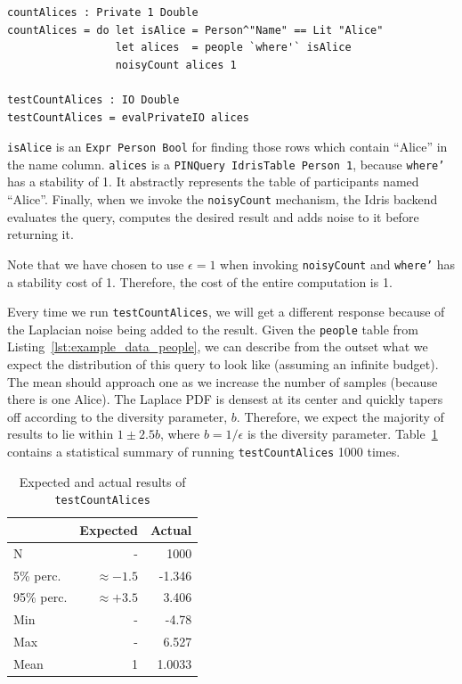 \documentclass[12pt]{article}
\begin{document}
\begin{lstlisting}
countAlices : Private 1 Double
countAlices = do let isAlice = Person^"Name" == Lit "Alice"
                 let alices  = people `where'` isAlice
                 noisyCount alices 1

testCountAlices : IO Double
testCountAlices = evalPrivateIO alices
\end{lstlisting}

\texttt{isAlice} is an \texttt{Expr Person Bool} for finding those rows which contain ``Alice'' in the name column.
\texttt{alices} is a \texttt{PINQuery IdrisTable Person 1}, because \texttt{where'} has a stability of 1.
It abstractly represents the table of participants named ``Alice''.
Finally, when we invoke the \texttt{noisyCount} mechanism, the Idris backend evaluates the query, computes the desired result and adds noise to it before returning it.

Note that we have chosen to use $\epsilon = 1$ when invoking \texttt{noisyCount} and \texttt{where'} has a stability cost of 1.
Therefore, the cost of the entire computation is 1.

Every time we run \texttt{testCountAlices}, we will get a different response because of the Laplacian noise being added to the result.
Given the \texttt{people} table from Listing~\ref{lst:example_data_people}, we can describe from the outset what we expect the distribution of this query to look like (assuming an infinite budget).
The mean should approach one as we increase the number of samples (because there is one Alice).
The Laplace PDF is densest at its center and quickly tapers off according to the diversity parameter, $b$.
Therefore, we expect the majority of results to lie within $1 \pm 2.5b$, where $b=1/\epsilon$ is the diversity parameter.
Table~\ref{tab:testCountAlices_results} contains a statistical summary of running \texttt{testCountAlices} 1000 times.

\begin{table}[h!]
  \caption{Expected and actual results of \texttt{testCountAlices}}
  \label{tab:testCountAlices_results}
  \centering

  \begin{tabular}{|l|rr|}
  \hline

  \hline
  \textbf{} & \textbf{Expected} & \textbf{Actual} \\
  \hline
    N          &             -  &   1000 \\
    5\% perc.  & $\approx -1.5$ & -1.346 \\
    95\% perc. & $\approx +3.5$ &  3.406 \\
    Min        &             -  &  -4.78 \\
    Max        &             -  &  6.527 \\
    Mean       &             1  & 1.0033 \\
  \hline

  \hline
  \end{tabular}
\end{table}
\end{document}
